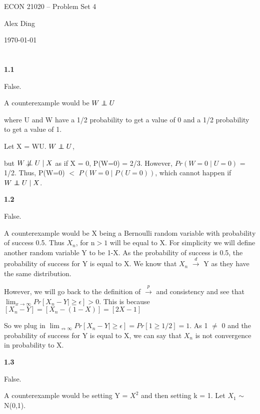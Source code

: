\documentclass{article}
\newcommand\independent{\protect\mathpalette{\protect\independenT}{\perp}}
\def\independenT#1#2{\mathrel{\rlap{$#1#2$}\mkern2mu{#1#2}}}
\begin{document}
{\LARGE \centering ECON 21020 -- Problem Set 4\par}
{\vspace{-1em} \large \centering Alex Ding \par}
{\centering \vspace{-1em} \today \par }


\section{}

\textbf{1.1}

False.

A counterexample would be $W \independent U$ \par where U and W have a 1/2 probability to get a value of 0 and a 1/2 probability to get a value of 1. 

Let X = WU. $W \independent U$, \par but $W \not\!\perp\!\!\!\perp U \mid X$ as if X = 0, P(W=0) = 2/3. However, $Pr(W=0 \mid U = 0)$ = 1/2. Thus, P(W=0) $<$ $P(W=0\mid P(U=0))$, which cannot happen if $W \independent U \mid X$.

\textbf{1.2}

False.

A counterexample would be X being a Bernoulli random variable with probability of success 0.5. Thus $X_{n}$, for n$>1$ will be equal to X. For simplicity we will define another random variable Y to be 1-X. As the probability of success is 0.5, the probability of success for Y is equal to X. We know that $X_{n}$ $\xrightarrow{d}$ Y as they have the same distribution. 

However, we will go back to the definition of $\xrightarrow{p}$ and consistency and see that $\lim_{x \to \infty} Pr[X_{n} - Y \mid \geq \epsilon] > 0$. This is because $[X_{n} - Y] = [X_{n} - (1 - X)] = [2X -1] $

So we plug in $\lim_{\nrightarrow \infty} Pr[X_{n} - Y \mid \geq \epsilon] = Pr[ 1 \geq 1/2] = 1$. As 1 $\neq$ 0 and the probability of success for Y is equal to X, we can say that $X_{n}$ is not convergence in probability to X.

\textbf{1.3}

False.

A counterexample would be setting Y = $X^{2}$ and then setting k = 1. Let $X_{1}$ $\sim{}$ N(0,1).
\end{document}
